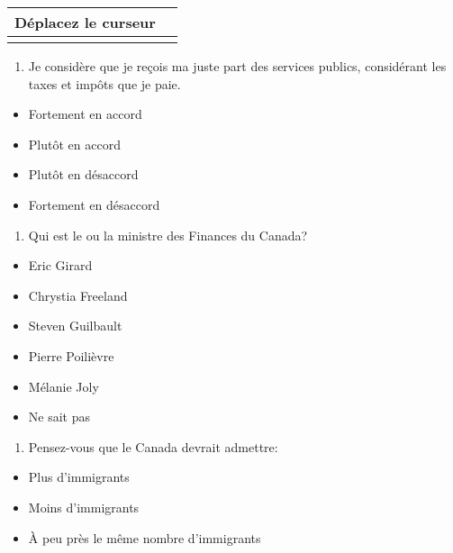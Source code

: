 \documentclass[
  letterpaper,
  DIV=11,
  numbers=noendperiod]{scrreprt}
\providecommand{\tightlist}{%
  \setlength{\itemsep}{0pt}\setlength{\parskip}{0pt}}\usepackage{longtable,booktabs,array}
\begin{document}
\begin{longtable}[]{@{}ll@{}}
\toprule\noalign{}
Déplacez le curseur & \\
\midrule\noalign{}
\endhead
\bottomrule\noalign{}
\endlastfoot
\end{longtable}

\begin{enumerate}
\def\labelenumi{\arabic{enumi}.}
\setcounter{enumi}{31}
\tightlist
\item
  Je considère que je reçois ma juste part des services publics,
  considérant les taxes et impôts que je paie.
\end{enumerate}

\begin{itemize}
\tightlist
\item
  Fortement en accord
\item
  Plutôt en accord
\item
  Plutôt en désaccord
\item
  Fortement en désaccord
\end{itemize}

\begin{enumerate}
\def\labelenumi{\arabic{enumi}.}
\setcounter{enumi}{32}
\tightlist
\item
  Qui est le ou la ministre des Finances du Canada?
\end{enumerate}

\begin{itemize}
\tightlist
\item
  Eric Girard
\item
  Chrystia Freeland
\item
  Steven Guilbault
\item
  Pierre Poilièvre
\item
  Mélanie Joly
\item
  Ne sait pas
\end{itemize}

\begin{enumerate}
\def\labelenumi{\arabic{enumi}.}
\setcounter{enumi}{33}
\tightlist
\item
  Pensez-vous que le Canada devrait admettre:
\end{enumerate}

\begin{itemize}
\tightlist
\item
  Plus d'immigrants
\item
  Moins d'immigrants
\item
  À peu près le même nombre d'immigrants
\end{itemize}
\end{document}
